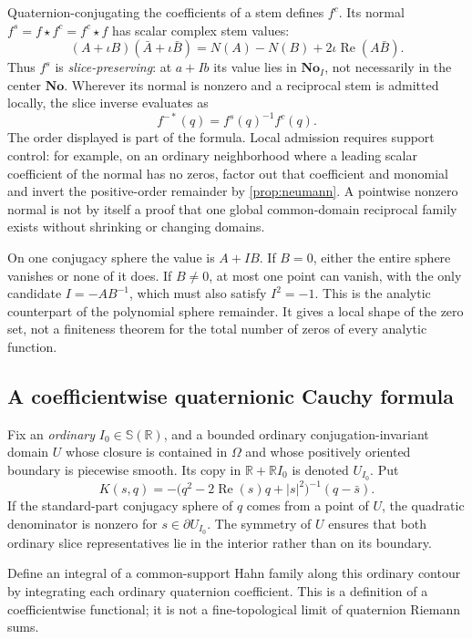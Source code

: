 \documentclass[11pt,letterpaper]{article}
\numberwithin{equation}{section}
\theoremstyle{definition}
\theoremstyle{remark}
\newcommand{\No}{\mathbf{No}}
\newcommand{\R}{\mathbb R}
\newcommand{\Rea}{\operatorname{Re}}
\begin{document}
Quaternion-conjugating the coefficients of a stem defines $f^c$. Its normal
$f^s=f\star f^c=f^c\star f$ has scalar complex stem values:
\[
 (A+\iota B)(\bar A+\iota\bar B)
 =N(A)-N(B)+2\iota\Rea(A\bar B).
\]
Thus $f^s$ is \emph{slice-preserving}: at $a+Ib$ its value lies in $\No_I$, not necessarily
in the center $\No$. Wherever its normal is nonzero and a reciprocal stem is admitted
locally, the slice inverse evaluates as
\begin{equation}\label{eq:starinverse}
 f^{-*}(q)=f^s(q)^{-1}f^c(q).
\end{equation}
The order displayed is part of the formula. Local admission requires support control:
for example, on an ordinary neighborhood where a leading scalar coefficient of the normal
has no zeros, factor out that coefficient and monomial and invert the positive-order
remainder by \cref{prop:neumann}. A pointwise nonzero normal is not by itself a proof that
one global common-domain reciprocal family exists without shrinking or changing domains.

On one conjugacy sphere the value is $A+IB$. If $B=0$, either the entire sphere vanishes
or none of it does. If $B\ne0$, at most one point can vanish, with the only candidate
$I=-AB^{-1}$, which must also satisfy $I^2=-1$. This is the analytic counterpart of the
polynomial sphere remainder. It gives a local shape of the zero set, not a finiteness theorem
for the total number of zeros of every analytic function.

\subsection{A coefficientwise quaternionic Cauchy formula}\label{sec:cauchy}
Fix an \emph{ordinary} $I_0\in\mathbb S(\R)$, and a bounded ordinary conjugation-invariant
domain $U$ whose closure is contained in $\Omega$ and whose positively oriented boundary
is piecewise smooth.
Its copy in $\R+\R I_0$ is denoted $U_{I_0}$. Put
\begin{equation}\label{eq:cauchykernel}
 K(s,q)=-\bigl(q^2-2\Rea(s)q+|s|^2\bigr)^{-1}(q-\bar s).
\end{equation}
If the standard-part conjugacy sphere of $q$ comes from a point of $U$, the quadratic
denominator is nonzero for $s\in\partial U_{I_0}$. The symmetry of $U$ ensures that both
ordinary slice representatives lie in the interior rather than on its boundary.

Define an integral of a common-support Hahn family along this ordinary contour by
integrating each ordinary quaternion coefficient. This is a definition of a coefficientwise
functional; it is not a fine-topological limit of quaternion Riemann sums.
\end{document}
